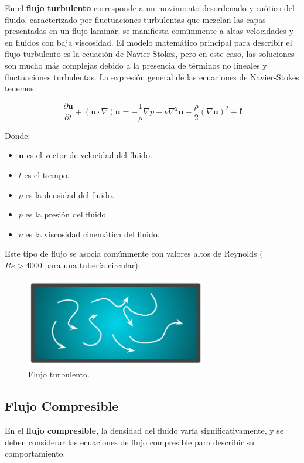 \documentclass[10pt, oneside]{article}
\begin{document}
En el \textbf{flujo turbulento} corresponde a un movimiento desordenado y caótico del fluido, caracterizado por fluctuaciones turbulentas que mezclan las capas presentadas en un flujo laminar, se manifiesta comúnmente a altas velocidades y en fluidos con baja viscosidad. El modelo matemático principal para describir el flujo turbulento es la ecuación de Navier-Stokes, pero en este caso, las soluciones son mucho más complejas debido a la presencia de términos no lineales y fluctuaciones turbulentas. La expresión general de las ecuaciones de Navier-Stokes tenemos: 

\[ \frac{\partial \mathbf{u}}{\partial t} + (\mathbf{u} \cdot \nabla)\mathbf{u} = -\frac{1}{\rho}\nabla p + \nu \nabla^2 \mathbf{u} - \frac{\rho}{2}(\nabla \mathbf{u})^2 + \mathbf{f} \]

Donde:
\begin{itemize}
  \item $\mathbf{u}$ es el vector de velocidad del fluido.
  \item $t$ es el tiempo.
  \item $\rho$ es la densidad del fluido.
  \item $p$ es la presión del fluido.
  \item $\nu$ es la viscosidad cinemática del fluido.
\end{itemize} 

Este tipo de flujo se asocia comúnmente con valores altos de Reynolds ($Re > 4000$ para una tubería circular).

\begin{figure}[h]
\centering
\includegraphics[width=8cm]{Fig.8.jpg}
\caption{Flujo turbulento.}
\label{tmove}
\end{figure}


\subsection{Flujo Compresible}

En el \textbf{flujo compresible}, la densidad del fluido varía significativamente, y se deben considerar las ecuaciones de flujo compresible para describir su comportamiento.
\end{document}
